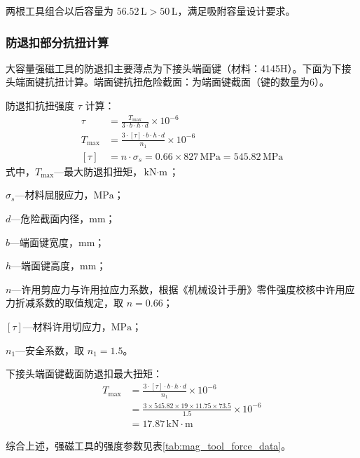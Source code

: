 两根工具组合以后容量为 $56.52\,\text{L} > 50\,\text{L}$，满足吸附容量设计要求。


\subsubsection{防退扣部分抗扭计算}
大容量强磁工具的防退扣主要薄点为下接头端面键（材料：4145H）。下面为下接头端面键抗扭计算。端面键抗扭危险截面：为端面键截面（键的数量为6）。

防退扣抗扭强度 $\tau$ 计算：
\begin{align}
    \tau &= \frac{T_{\max}}{3 \cdot b \cdot h \cdot d} \times 10^{-6} \\
    T_{\max} &= \frac{3 \cdot [\tau] \cdot b \cdot h \cdot d}{n_1} \times 10^{-6} \\
    [\tau] &= n \cdot \sigma_s = 0.66 \times 827\,\text{MPa} = 545.82\,\text{MPa}
\end{align}
式中，$T_{\max}$---最大防退扣扭矩，$\text{kN}\cdot\text{m}$；

$\sigma_s$---材料屈服应力，$\text{MPa}$；

$d$---危险截面内径，mm；

$b$---端面键宽度，mm；

$h$---端面键高度，mm；

$n$---许用剪应力与许用拉应力系数，根据《机械设计手册》零件强度校核中许用应力折减系数的取值规定\cite{ref26}，取 $n = 0.66$；

$[\tau]$---材料许用切应力，$\text{MPa}$；

$n_1$---安全系数，取 $n_1 = 1.5$。

下接头端面键截面防退扣最大扭矩：
\begin{align}
    T_{\max} &= \frac{3 \cdot [\tau] \cdot b \cdot h \cdot d}{n_1} \times 10^{-6} \\
             &= \frac{3 \times 545.82 \times 19 \times 11.75 \times 73.5}{1.5} \times 10^{-6} \\
             &= 17.87\,\text{kN}\cdot\text{m}
\end{align}


综合上述，强磁工具的强度参数见表\ref{tab:mag_tool_force_data}。

